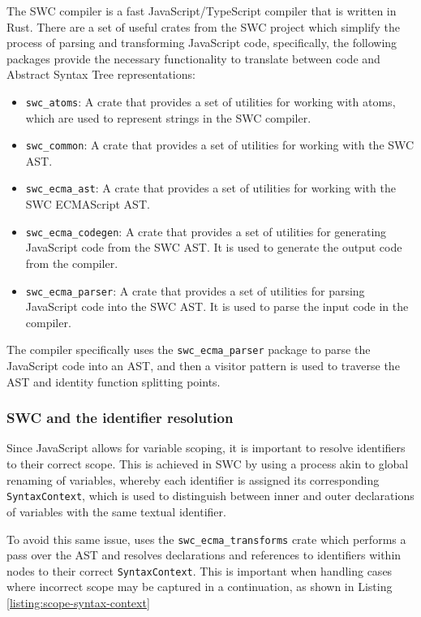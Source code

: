 The SWC compiler is a fast JavaScript/TypeScript compiler that is written in Rust. There are a set of useful crates from the SWC project which simplify the process of parsing and transforming JavaScript code, specifically, the following packages provide the necessary functionality to translate between code and Abstract Syntax Tree representations:

\begin{itemize}
    \item \verb|swc_atoms|: A crate that provides a set of utilities for working with atoms, which are used to represent strings in the SWC compiler.
    \item \verb|swc_common|: A crate that provides a set of utilities for working with the SWC AST.
    \item \verb|swc_ecma_ast|: A crate that provides a set of utilities for working with the SWC ECMAScript AST.
    \item \verb|swc_ecma_codegen|: A crate that provides a set of utilities for generating JavaScript code from the SWC AST. It is used to generate the output code from the \faaasc{} compiler.
    \item \verb|swc_ecma_parser|: A crate that provides a set of utilities for parsing JavaScript code into the SWC AST. It is used to parse the input code in the \faaasc{} compiler.
\end{itemize}

The \faaasc{} compiler specifically uses the \verb|swc_ecma_parser| package to parse the JavaScript code into an AST, and then a visitor pattern is used to traverse the AST and identity function splitting points.

\subsubsection{SWC and the identifier resolution}
Since JavaScript allows for variable scoping, it is important to resolve identifiers to their correct scope. This is achieved in SWC by using a process akin to global renaming of variables, whereby each identifier is assigned its corresponding \verb|SyntaxContext|, which is used to distinguish between inner and outer declarations of variables with the same textual identifier.

To avoid this same issue, \faaasc{} uses the \verb|swc_ecma_transforms| crate which performs a pass over the AST and resolves declarations and references to identifiers within nodes to their correct \verb|SyntaxContext|. This is important when handling cases where incorrect scope may be captured in a continuation, as shown in Listing \ref{listing:scope-syntax-context}

